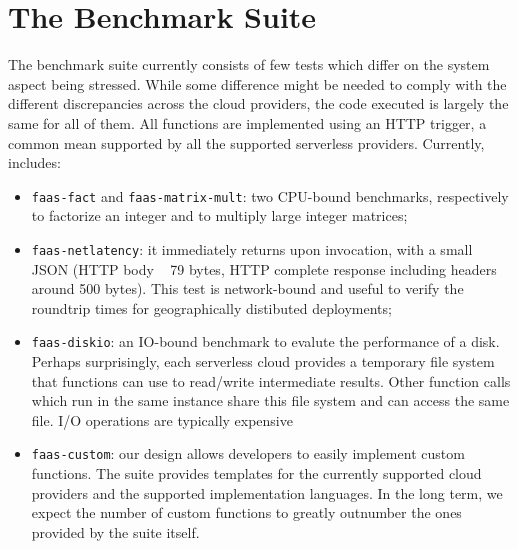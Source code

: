 \section{The \sys Benchmark Suite}\label{sec:tests}
The \sys benchmark suite currently consists of few tests which differ on the system aspect being stressed.
While some difference might be needed to comply with the different discrepancies across the cloud providers, the code executed is largely the same for all of them.
All functions are implemented using an \gls{HTTP} trigger, a common mean supported by all the supported serverless providers.
Currently, \sys includes:
\begin{itemize}
\item \texttt{faas-fact} and \texttt{faas-matrix-mult}: two CPU-bound benchmarks, respectively to factorize an integer and to multiply large integer matrices;
\item \texttt{faas-netlatency}: it immediately returns upon invocation, with a small \gls{JSON} (HTTP body ~ 79 bytes, HTTP complete response including headers around 500 bytes). This test is network-bound and useful to verify the roundtrip times for geographically distibuted deployments;
\item \texttt{faas-diskio}: an IO-bound benchmark to evalute the performance of a disk. Perhaps surprisingly, each serverless cloud provides a temporary file system that functions can use to read/write intermediate results. 
Other function calls which run in the same instance share this file system and can access the same file. %
I/O operations are typically expensive   %
\item \texttt{faas-custom}: our design allows developers to easily implement custom functions. 
The suite provides templates for the currently supported cloud providers and the supported implementation languages. 
In the long term, we expect the number of custom functions to greatly outnumber the ones provided by the suite itself.
\end{itemize}



